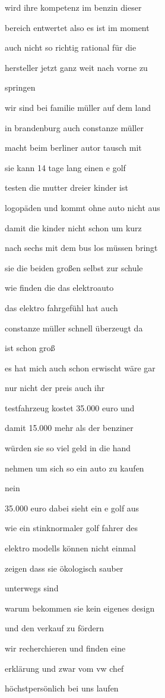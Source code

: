 \documentclass[a4paper, 11pt]{book} %
\begin{document}
wird ihre kompetenz im benzin dieser

bereich entwertet also es ist im moment

auch nicht so richtig rational für die

hersteller jetzt ganz weit nach vorne zu

springen

wir sind bei familie müller auf dem land

in brandenburg auch constanze müller

macht beim berliner autor tausch mit

sie kann 14 tage lang einen e golf

testen die mutter dreier kinder ist

logopäden und kommt ohne auto nicht aus

damit die kinder nicht schon um kurz

nach sechs mit dem bus los müssen bringt

sie die beiden großen selbst zur schule

wie finden die das elektroauto

das elektro fahrgefühl hat auch

constanze müller schnell überzeugt da

ist schon groß

es hat mich auch schon erwischt wäre gar

nur nicht der preis auch ihr

testfahrzeug kostet 35.000 euro und

damit 15.000 mehr als der benziner

würden sie so viel geld in die hand

nehmen um sich so ein auto zu kaufen

nein

35.000 euro dabei sieht ein e golf aus

wie ein stinknormaler golf fahrer des

elektro modells können nicht einmal

zeigen dass sie ökologisch sauber

unterwegs sind

warum bekommen sie kein eigenes design

und den verkauf zu fördern

wir recherchieren und finden eine

erklärung und zwar vom vw chef

höchstpersönlich bei uns laufen
\end{document}
